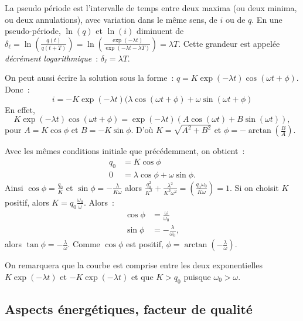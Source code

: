     La pseudo période est l'intervalle de temps entre deux maxima (ou deux minima, ou deux annulations), avec variation dans le même sens, de \(i\) ou de \(q\). En une pseudo-période, \(\ln(q)\) et \(\ln(i)\) diminuent de \(\delta_\ell = \ln\left(\frac{q(t)}{q(t+T)}\right) = \ln\left(\frac{\exp(-\lambda t)}{\exp(-\lambda t-\lambda T)}\right)=\lambda T\). Cette grandeur est appelée \emph{décrément logarithmique}~: \(\delta_\ell = \lambda T\).

    On peut aussi écrire la solution sous la forme~: \(q=K\exp(-\lambda t) \cos(\omega t +\phi)\). Donc~:
    \begin{equation}
      i = -K\exp(-\lambda t)(\lambda\cos(\omega t + \phi)+\omega\sin(\omega t +\phi)
    \end{equation}
    En effet,
    \begin{equation}
      K\exp(-\lambda t) \cos(\omega t +\phi) = \exp(-\lambda t)(A\cos(\omega t) + B\sin(\omega t)),
    \end{equation}
    pour \(A=K\cos \phi\) et \(B=-K\sin \phi\). D'où \(K=\sqrt{A^2+B^2}\) et \(\phi = -\arctan\left(\frac{B}{A}\right)\).

    Avec les mêmes conditions initiale que précédemment, on obtient~:
    \begin{align}
      q_0 &=K\cos \phi \\
        0 &= \lambda\cos\phi + \omega\sin\phi.
    \end{align}
    Ainsi \(\cos\phi = \frac{q_0}{K}\) et \(\sin\phi = -\frac{\lambda}{K\omega}\) alors \(\frac{q_0^2}{K^2} + \frac{\lambda^2}{K^2\omega^2}= \left(\frac{q_0 \omega_0}{K\omega}\right)=1\). Si on choisit \(K\) positif, alors \(K=q_0 \frac{\omega_0}{\omega}\). Alors~:
    \begin{align}
      \cos\phi &= \frac{\omega}{\omega_0} \\
      \sin\phi &=-\frac{\lambda}{\omega_0},
    \end{align}
    alors \(\tan \phi = -\frac{\lambda}{\omega}\). Comme \(\cos\phi\) est positif, \(\phi = \arctan\left(-\frac{\lambda}{\omega}\right)\).

    On remarquera que la courbe est comprise entre les deux exponentielles \(K\exp(-\lambda t)\) et \(-K\exp(-\lambda t)\) et que \(K>q_0\) puisque \(\omega_0>\omega\).
  \subsection{Aspects énergétiques, facteur de qualité}

